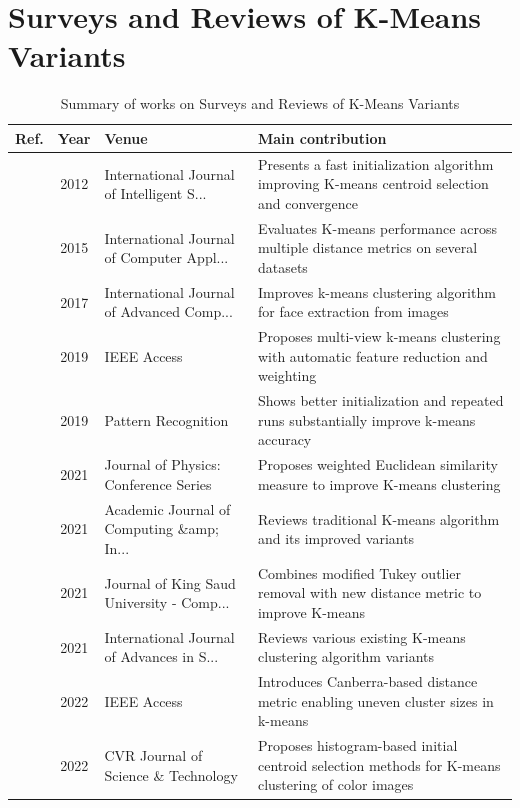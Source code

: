 \section{Surveys and Reviews of K-Means Variants}\label{sec:theme3}
\begin{table}[!t]
\centering
\renewcommand{\arraystretch}{1.2}
\caption{Summary of works on Surveys and Reviews of K-Means Variants}\label{tab:theme3}
\begin{tabularx}{\textwidth}{@{}l c p{3.6cm} X@{}}
\toprule
\textbf{Ref.} & \textbf{Year} & \textbf{Venue} & \textbf{Main contribution} \\
\midrule
\cite{agha2012efficient} & 2012 & International Journal of Intelligent S... & Presents a fast initialization algorithm improving K-means centroid selection and convergence \\
\cite{sthakare2015performance} & 2015 & International Journal of Computer Appl... & Evaluates K-means performance across multiple distance metrics on several datasets \\
\cite{farhang2017face} & 2017 & International Journal of Advanced Comp... & Improves k-means clustering algorithm for face extraction from images \\
\cite{yang2019feature} & 2019 & IEEE Access & Proposes multi-view k-means clustering with automatic feature reduction and weighting \\
\cite{franti2019how} & 2019 & Pattern Recognition & Shows better initialization and repeated runs substantially improve k-means accuracy \\
\cite{zhao2021means} & 2021 & Journal of Physics: Conference Series & Proposes weighted Euclidean similarity measure to improve K-means clustering \\
\cite{chong2021means} & 2021 & Academic Journal of Computing \&amp; In... & Reviews traditional K-means algorithm and its improved variants \\
\cite{shrifan2021adaptive} & 2021 & Journal of King Saud University - Comp... & Combines modified Tukey outlier removal with new distance metric to improve K-means \\
\cite{oti2021comprehensive} & 2021 & International Journal of Advances in S... & Reviews various existing K-means clustering algorithm variants \\
\cite{raeisi2022distance} & 2022 & IEEE Access & Introduces Canberra-based distance metric enabling uneven cluster sizes in k-means \\
\cite{bhavani2022efficient} & 2022 & CVR Journal of Science \& Technology & Proposes histogram-based initial centroid selection methods for K-means clustering of color images \\

\end{tabularx}
\end{table}
